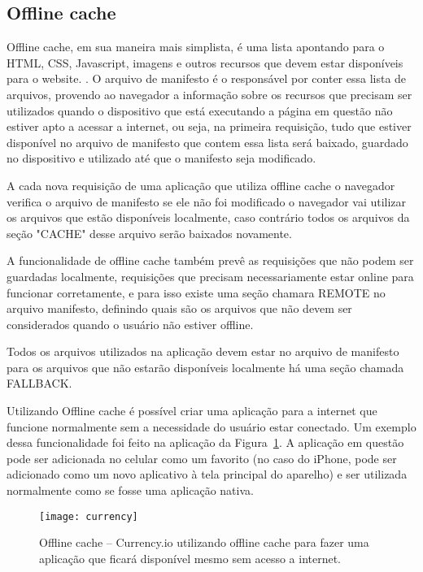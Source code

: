 \subsection{Offline cache}

Offline cache, em sua maneira mais simplista, é uma lista apontando
para o HTML, CSS, Javascript, imagens e outros recursos que devem
estar disponíveis para o website. \cite{pilgrim2010html5}. O arquivo de
manifesto é o responsável por conter essa lista de arquivos, provendo
ao navegador a informação sobre os recursos que
precisam ser utilizados quando o dispositivo que está executando a
página em questão não estiver apto a acessar a internet, ou seja,
na primeira requisição, tudo que estiver disponível no arquivo de manifesto
que contem essa lista será baixado, guardado no dispositivo e utilizado até
que o manifesto seja modificado.

A cada nova requisição de uma aplicação que utiliza offline cache o
navegador verifica o arquivo de manifesto se ele não foi modificado
o navegador vai utilizar os arquivos que estão disponíveis localmente,
caso contrário todos os arquivos da seção "CACHE" desse arquivo serão baixados novamente.

A funcionalidade de offline cache também prevê as requisições que não
podem ser guardadas localmente, requisições que precisam
necessariamente estar online para funcionar corretamente, e para isso
existe uma seção chamara REMOTE no arquivo manifesto, definindo quais
são os arquivos que não devem ser considerados quando o usuário não
estiver offline.

Todos os arquivos utilizados na aplicação devem estar no arquivo de
manifesto para os arquivos que não estarão disponíveis localmente há
uma seção chamada FALLBACK.

Utilizando Offline cache é possível criar uma aplicação para a
internet que funcione normalmente sem a necessidade do usuário estar
conectado. Um exemplo dessa funcionalidade foi feito na aplicação da
Figura~\ref{img:currency}. A aplicação em questão pode ser adicionada
no celular como um favorito (no caso do iPhone, pode ser adicionado
como um novo aplicativo à tela principal do aparelho) e ser utilizada
normalmente como se fosse uma aplicação nativa.

\begin{figure}[H]
  \centering
	\texttt{[image: currency]}
  \caption{Offline cache {--} Currency.io utilizando offline cache
  para fazer uma aplicação que ficará disponível mesmo sem acesso a
  internet.}
  \label{img:currency}
\end{figure}

